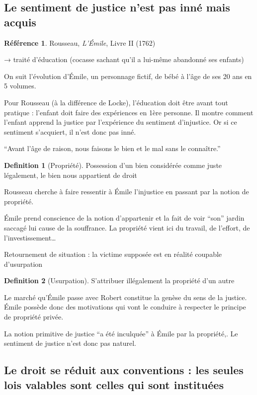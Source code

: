 \documentclass[french]{book}
\theoremstyle{definition}
\newtheorem*{dfn}{Definition}
\newtheorem*{refe}{Référence}
\begin{document}
\subsection{Le sentiment de justice n’est pas inné mais acquis}

\begin{refe}
	Rousseau, \textit{L’Émile}, Livre II (1762)
\end{refe}
→ traité d’éducation (cocasse sachant qu’il a lui-même abandonné ses enfants)

On suit l’évolution d’Émile, un personnage fictif, de bébé à l’âge de ses 20 ans en 5 volumes.

Pour Rousseau (à la différence de Locke), l’éducation doit être avant tout pratique : l’enfant doit faire des expériences en 1ère personne. Il montre comment l'enfant apprend la justice par l’expérience du sentiment d'injustice. Or si ce sentiment s’acquiert, il n’est donc pas inné.

“Avant l’âge de raison, nous faisons le bien et le mal sans le connaître.”

\begin{dfn}[Propriété]
Possession d’un bien considérée comme juste légalement, le bien nous appartient de droit
\end{dfn}

Rousseau cherche à faire ressentir à Émile l’injustice en passant par la notion de propriété.

Émile prend conscience de la notion d'appartenir et la fait de voir “son” jardin saccagé lui cause de la souffrance. La propriété vient ici du travail, de l’effort, de l'investissement…

Retournement de situation : la victime supposée est en réalité coupable d’usurpation

\begin{dfn}[Usurpation]
S’attribuer illégalement la propriété d’un autre
\end{dfn}

Le marché qu’Émile passe avec Robert constitue la genèse du sens de la justice. Émile possède donc des motivations qui vont le conduire à respecter le principe de propriété privée.

La notion primitive de justice “a été inculquée” à Émile par la propriété,. Le sentiment de justice n’est donc pas naturel.

\subsection{Le droit se réduit aux conventions : les seules lois valables sont celles qui sont instituées}
\end{document}
